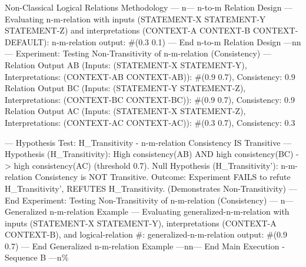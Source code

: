 Non-Classical Logical Relations Methodology --- n--- n-to-m Relation
Design --- Evaluating n-m-relation with inputs (STATEMENT-X STATEMENT-Y
STATEMENT-Z) and interpretations (CONTEXT-A CONTEXT-B CONTEXT-DEFAULT):
n-m-relation output: \#(0.3 0.1) --- End n-to-m Relation Design ---nn---
Experiment: Testing Non-Transitivity of n-m-relation (Consistency) ---
Relation Output AB (Inputs: (STATEMENT-X STATEMENT-Y), Interpretations:
(CONTEXT-AB CONTEXT-AB)): \#(0.9 0.7), Consistency: 0.9 Relation Output
BC (Inputs: (STATEMENT-Y STATEMENT-Z), Interpretations: (CONTEXT-BC
CONTEXT-BC)): \#(0.9 0.7), Consistency: 0.9 Relation Output AC (Inputs:
(STATEMENT-X STATEMENT-Z), Interpretations: (CONTEXT-AC CONTEXT-AC)):
\#(0.3 0.7), Consistency: 0.3

--- Hypothesis Test: H\_Transitivity - n-m-relation Consistency IS
Transitive --- Hypothesis (H\_Transitivity): High consistency(AB) AND
high consistency(BC) -\textgreater{} high consistency(AC) (threshold
0.7). Null Hypothesis (H\_Transitivity'): n-m-relation Consistency is
NOT Transitive. Outcome: Experiment FAILS to refute H\_Transitivity',
REFUTES H\_Transitivity. (Demonstrates Non-Transitivity) --- End
Experiment: Testing Non-Transitivity of n-m-relation (Consistency) ---
n--- Generalized n-m-relation Example --- Evaluating
generalized-n-m-relation with inputs (STATEMENT-X STATEMENT-Y),
interpretations (CONTEXT-A CONTEXT-B), and logical-relation \#:
generalized-n-m-relation output: \#(0.9 0.7) --- End Generalized
n-m-relation Example ---nn--- End Main Execution - Sequence B ---n\%

